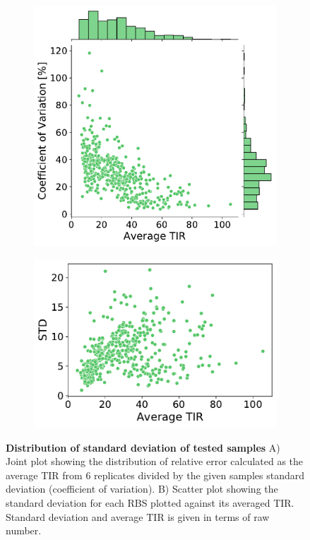 \begin{figure}[!ht]
    \centering
    \begin{subfigure}[b]{0.49\textwidth}
        \centering
        \caption{}
        \includegraphics[scale=0.4]{plots/Supplementary/SD.pdf}
    \end{subfigure}
    \hfill
    \begin{subfigure}[b]{0.49\textwidth}
        \centering
        \caption{}
        \includegraphics[scale=0.6]{plots/Supplementary/SDvsTIR.pdf}
    \end{subfigure}
    \caption{\textbf{Distribution of standard deviation of tested samples} A) Joint plot showing the distribution of relative error calculated as the average TIR from 6 replicates divided by the given samples standard deviation (coefficient of variation). B) Scatter plot showing the standard deviation for each RBS plotted against its averaged TIR. Standard deviation and average TIR is given in terms of raw number.}
    \label{fig:variation of biological replicates}
\end{figure}

